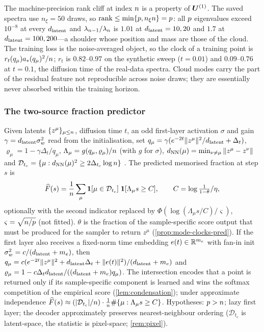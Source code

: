 \begin{remark}\label{rem:single-vs-averaged-pred}
The machine-precision rank cliff at index $n$ is a property of $\bm{U}^{(1)}$. The saved spectra use $n_\xi=50$ draws, so $\mathrm{rank}\le\min\{p,n_\xi n\}=p$: all $p$ eigenvalues exceed $10^{-8}$ at every $d_{\mathrm{latent}}$ and $\lambda_{n-1}/\lambda_{n}$ is $1.01$ at $d_{\mathrm{latent}}=10,20$ and $1.7$ at $d_{\mathrm{latent}}=100,200$---a shoulder whose position and mass are those of the cloud. The training loss is the noise-averaged object, so the clock of a training point is $r_t(q_\mu)a_*(q_\mu)^2/n$; $r_t$ is $0.82$--$0.97$ on the synthetic sweep ($t=0.01$) and $0.09$--$0.76$ at $t=0.1$, the diffusion time of the real-data spectra. Cloud modes carry the part of the residual feature not reproducible across noise draws; they are essentially never absorbed within the training horizon.
\end{remark}

\subsubsection{The two-source fraction predictor}

\begin{definition}\label{def:two-source-predictor-pred}
Given latents $\{z^\mu\}_{\mu\le n}$, diffusion time $t$, an odd first-layer activation $\sigma$ and gain $\gamma=d_{\mathrm{latent}}\sigma_w^2$ read from the initialisation, set $q_\mu=\gamma(e^{-2t}\|z^\mu\|^2/d_{\mathrm{latent}}+\Delta_t)$, $\varrho_\mu=1-\gamma\Delta_t/q_\mu$, $\Lambda_\mu=g(q_\mu,\varrho_\mu)/n$ (with $g$ for $\sigma$), $d_{\rm NN}(\mu)=\min_{\nu\ne\mu}\|z^\mu-z^\nu\|$ and $\mathcal D_{t_c}=\{\mu:d_{\rm NN}(\mu)^2\ge2\Delta_{t_c}\log n\}$ \citep{biroli2024dynamical}. The predicted memorised fraction at step $s$ is
\[ \widehat F(s)=\frac1{n}\sum_\mu\mathbf 1[\mu\in\mathcal D_{t_c}]\;\mathbf 1[\Lambda_\mu s\ge C],\qquad C=\log\tfrac1{1-\theta}/\eta, \]
optionally with the second indicator replaced by $\Phi(\log(\Lambda_\mu s/C)/\varsigma)$, $\varsigma=\sqrt{n/p}$ (not fitted). $\theta$ is the fraction of the sample-specific score output that must be produced for the sampler to return $z^\mu$ (\cref{prop:mode-clocks-pred}). If the first layer also receives a fixed-norm time embedding $e(t)\in\mathbb{R}^{m_e}$ with fan-in init $\sigma_w^2=c/(d_{\mathrm{latent}}+m_e)$, then $q_\mu=c(e^{-2t}\|z^\mu\|^2+d_{\mathrm{latent}}\Delta_t+\|e(t)\|^2)/(d_{\mathrm{latent}}+m_e)$ and $\varrho_\mu=1-c\Delta_td_{\mathrm{latent}}/((d_{\mathrm{latent}}+m_e)q_\mu)$. The intersection encodes that a point is returned only if its sample-specific component is learned and wins the softmax competition of the empirical score (\cref{lem:condensation}); under approximate independence $\widehat F(s)\approx(|\mathcal D_{t_c}|/n)\cdot\frac1{n}\#\{\mu:\Lambda_\mu s\ge C\}$. Hypotheses: $p>n$; lazy first layer; the decoder approximately preserves nearest-neighbour ordering ($\mathcal D_{t_c}$ is latent-space, the statistic is pixel-space; \cref{rem:pixel}).
\end{definition}


